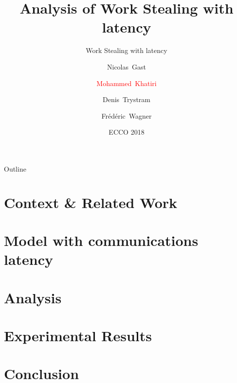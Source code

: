 \documentclass{beamer}
\title{Analysis of Work Stealing with latency}
\subtitle{Work Stealing with latency}
\author{Nicolas~Gast\inst{1} \and \textcolor{red}{Mohammed~Khatiri}\inst{1}\inst{2} \and Denis~Trystram\inst{1} \and Fr\'ed\'eric~Wagner\inst{1}}
\institute[Univ. Grenoble Alpes, CNRS, Inria, LIG] %
{
    \inst{1}%
  Univ. Grenoble Alpes, France
  \and
  \inst{2}%
  University Mohammed I -- Faculty of Sciences, Morocco}
\date{ECCO 2018}
\begin{document}
\begin{frame}
    \titlepage
\end{frame}

\begin{frame}{Outline}
    \tableofcontents
\end{frame}

\section{Context \& Related Work}
\section{Model with communications latency}
\section{Analysis}
\section{Experimental Results}
\section{Conclusion}
\end{document}
